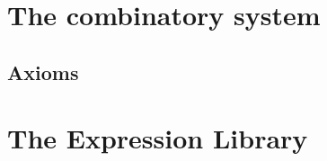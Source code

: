 \documentclass{amsart}
\begin{document}
\section{The combinatory system}

\subsection{Axioms}


\section{The Expression Library}

\end{document}
